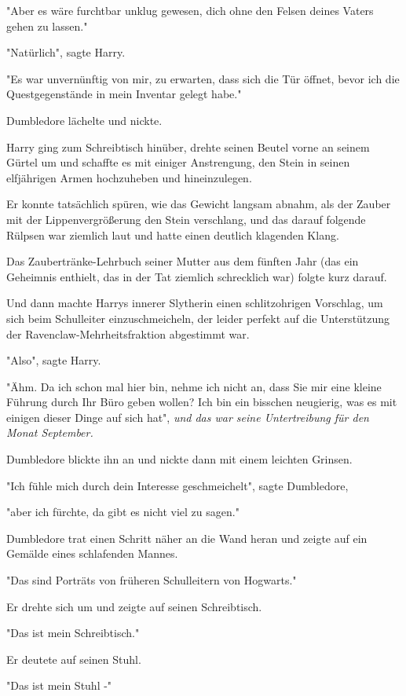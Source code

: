 {"Aber es wäre furchtbar unklug gewesen, dich ohne den Felsen deines Vaters gehen zu lassen."

"Natürlich", sagte Harry.

"Es war unvernünftig von mir, zu erwarten, dass sich die Tür öffnet, bevor ich die Questgegenstände in mein Inventar gelegt habe."

Dumbledore lächelte und nickte.

Harry ging zum Schreibtisch hinüber, drehte seinen Beutel vorne an seinem Gürtel um und schaffte es mit einiger Anstrengung, den Stein in seinen elfjährigen Armen hochzuheben und hineinzulegen.

Er konnte tatsächlich spüren, wie das Gewicht langsam abnahm, als der Zauber mit der Lippenvergrößerung den Stein verschlang, und das darauf folgende Rülpsen war ziemlich laut und hatte einen deutlich klagenden Klang.

Das Zaubertränke-Lehrbuch seiner Mutter aus dem fünften Jahr (das ein Geheimnis enthielt, das in der Tat ziemlich schrecklich war) folgte kurz darauf.

Und dann machte Harrys innerer Slytherin einen schlitzohrigen Vorschlag, um sich beim Schulleiter einzuschmeicheln, der leider perfekt auf die Unterstützung der Ravenclaw-Mehrheitsfraktion abgestimmt war.

"Also", sagte Harry.

"Ähm. Da ich schon mal hier bin, nehme ich nicht an, dass Sie mir eine kleine Führung durch Ihr Büro geben wollen? Ich bin ein bisschen neugierig, was es mit einigen dieser Dinge auf sich hat", \emph{und das war seine Untertreibung für den Monat September.}

Dumbledore blickte ihn an und nickte dann mit einem leichten Grinsen.

"Ich fühle mich durch dein Interesse geschmeichelt", sagte Dumbledore,

"aber ich fürchte, da gibt es nicht viel zu sagen."

Dumbledore trat einen Schritt näher an die Wand heran und zeigte auf ein Gemälde eines schlafenden Mannes.

"Das sind Porträts von früheren Schulleitern von Hogwarts."

Er drehte sich um und zeigte auf seinen Schreibtisch.

"Das ist mein Schreibtisch."

Er deutete auf seinen Stuhl.

"Das ist mein Stuhl -"

}
